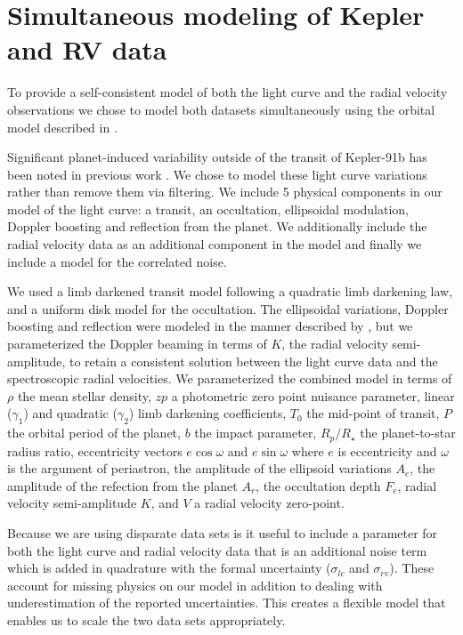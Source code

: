 \documentclass[apjl]{emulateapj}
\begin{document}
\section{Simultaneous modeling of Kepler and RV data}
To provide a self-consistent model of both the light curve and the radial velocity observations we chose to model both datasets simultaneously using the orbital model described in \citet{rowe14}.

Significant planet-induced variability outside of the transit of Kepler-91b has been noted in previous work \citep{lillo14,esteves13}. We chose to model these light curve variations rather than remove them via filtering.  We include 5 physical components in our model of the light curve: a transit, an occultation, ellipsoidal modulation, Doppler boosting and reflection from the planet. We additionally include the radial velocity data as an additional component in the model and finally we include a model for the correlated noise.

We used a limb darkened transit model \citep{mandel02} following a quadratic limb darkening law, and a uniform disk model for the occultation. The ellipsoidal variations, Doppler boosting and reflection were modeled in the manner described by \citet{lillo14}, but we parameterized the Doppler beaming in terms of $K$, the radial velocity semi-amplitude, to retain a consistent solution between the light curve data and the spectroscopic radial velocities. We parameterized the combined model in terms of $\rho$ the mean stellar density, $zp$ a photometric zero point nuisance parameter, linear ($\gamma_1$) and quadratic ($\gamma_2$) limb darkening coefficients, $T_0$ the mid-point of transit, $P$ the orbital period of the planet, $b$ the impact parameter, $R_{p}/R_{\star}$ the planet-to-star radius ratio, eccentricity vectors $e\cos{\omega}$ and $e\sin{\omega}$ where $e$ is eccentricity and $\omega$ is the argument of periastron, the amplitude of the ellipsoid variations $A_e$, the amplitude of the refection from the planet $A_r$, the occultation depth $F_e$, radial velocity semi-amplitude $K$, and $V$ a radial velocity zero-point.

Because we are using disparate data sets is it useful to include a parameter for both the light curve and radial velocity data that is an additional noise term which is added in quadrature with the formal uncertainty ($\sigma_{lc}$ and $\sigma_{rv}$). These account for missing physics on our model in addition to dealing with underestimation of the reported uncertainties. This creates a flexible model that enables us to scale the two data sets appropriately. 
\end{document}
